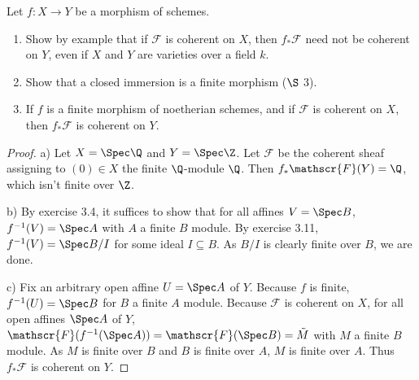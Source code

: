 \begin{exercise}[5.5]
	Let $f: X\to Y $ be a morphism of schemes.
	\begin{enumerate}
		\item Show by example that if $\mathscr{F} $ is coherent on $X $, then $f_\ast \mathscr{F} $ need not be coherent on $Y $, even if $X $ and $Y $ are varieties over a field $k $.
		\item Show that a closed immersion is a finite morphism ($\S$ 3).
		\item If $f $ is a finite morphism of noetherian schemes, and if $\mathscr{F} $ is coherent on $X $, then $f_\ast \mathscr{F} $ is coherent on $Y $.
	\end{enumerate}
\end{exercise}
\begin{proof}
	a) Let $X = \Spec \Q $ and $Y = \Spec \Z $.
	Let $\mathscr{F} $ be the coherent sheaf assigning to $(0) \in X$ the finite $\Q $-module $\Q $.
	Then $f_\ast \mathscr{F}(Y) = \Q$, which isn't finite over $\Z $.

	b) By exercise 3.4, it suffices to show that for all affines $V = \Spec B $, $f^{-1}(V) = \Spec A $ with $A $ a finite $B $ module.
	By exercise 3.11, $f^{-1}(V) = \Spec B / I$ for some ideal $I \subseteq B $.
	As $B / I $ is clearly finite over $B $, we are done.

	c) Fix an arbitrary open affine $U = \Spec A $ of $Y $.
	Because $f $ is finite, $f^{-1}(U) = \Spec B $ for $B $ a finite $A $ module.
	Because $\mathscr{F} $ is coherent on $X $, for all open affines $\Spec A $ of $Y $, $\mathscr{F}(f^{-1}(\Spec A)) = \mathscr{F}(\Spec B) = \tilde{M} $ with $M $ a finite $B $ module.
	As $M $ is finite over $B $ and $B $ is finite over $A $, $M $ is finite over $A $.
	Thus $f_\ast \mathscr{F} $ is coherent on $Y $.
\end{proof}

